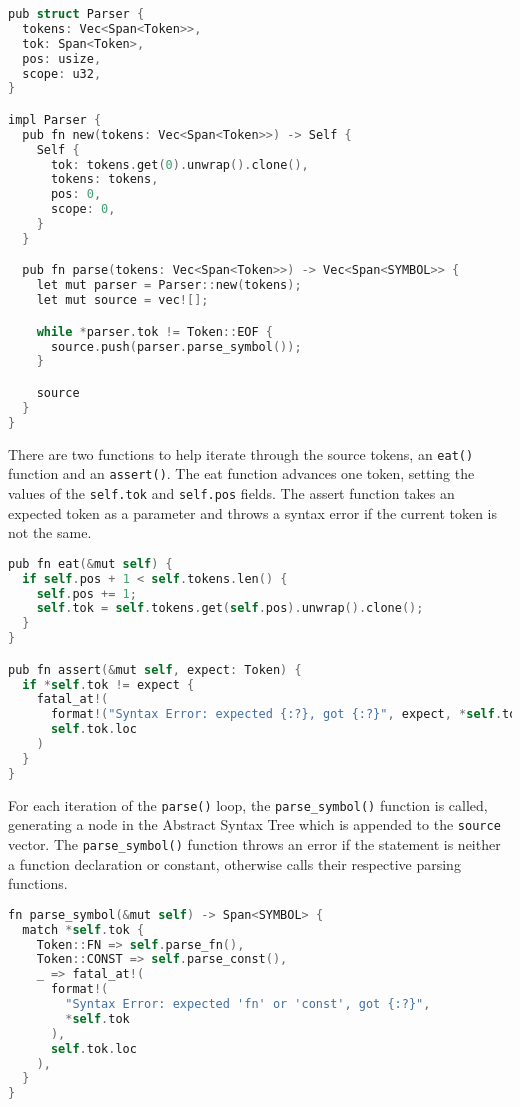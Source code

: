\begin{lstlisting}[language=C]
pub struct Parser {
  tokens: Vec<Span<Token>>,
  tok: Span<Token>,
  pos: usize,
  scope: u32,
}

impl Parser {
  pub fn new(tokens: Vec<Span<Token>>) -> Self {
    Self {
      tok: tokens.get(0).unwrap().clone(),
      tokens: tokens,
      pos: 0,
      scope: 0,
    }
  }

  pub fn parse(tokens: Vec<Span<Token>>) -> Vec<Span<SYMBOL>> {
    let mut parser = Parser::new(tokens);
    let mut source = vec![];

    while *parser.tok != Token::EOF {
      source.push(parser.parse_symbol());
    }

    source
  }
}  
\end{lstlisting}

There are two functions to help iterate through the source tokens, an \texttt{eat()} function and an \texttt{assert()}. The eat function advances one token, setting the values of the \texttt{self.tok} and \texttt{self.pos} fields. The assert function takes an expected token as a parameter and throws a syntax error if the current token is not the same.

\begin{lstlisting}[language=C]
pub fn eat(&mut self) {
  if self.pos + 1 < self.tokens.len() {
    self.pos += 1;
    self.tok = self.tokens.get(self.pos).unwrap().clone();
  }
}

pub fn assert(&mut self, expect: Token) {
  if *self.tok != expect {
    fatal_at!(
      format!("Syntax Error: expected {:?}, got {:?}", expect, *self.tok),
      self.tok.loc
    )
  }
}
\end{lstlisting}

For each iteration of the \texttt{parse()} loop, the \texttt{parse\_symbol()} function is called, generating a node in the Abstract Syntax Tree which is appended to the \texttt{source} vector. The \texttt{parse\_symbol()} function throws an error if the statement is neither a function declaration or constant, otherwise calls their respective parsing functions.

\begin{lstlisting}[language=C]
fn parse_symbol(&mut self) -> Span<SYMBOL> {
  match *self.tok {
    Token::FN => self.parse_fn(),
    Token::CONST => self.parse_const(),
    _ => fatal_at!(
      format!(
        "Syntax Error: expected 'fn' or 'const', got {:?}",
        *self.tok
      ),
      self.tok.loc
    ),
  }
}
\end{lstlisting}

